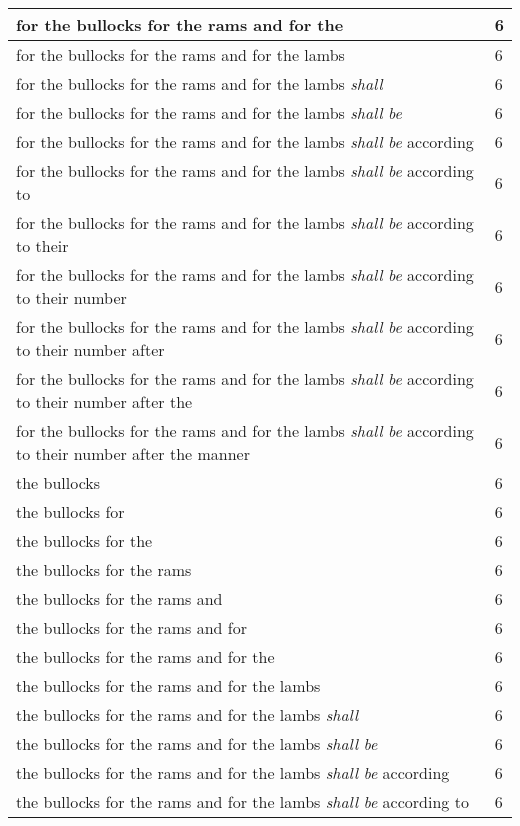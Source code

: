 \begin{center}
\begin{longtable}{|p{3.0in}|p{0.5in}|}
for the bullocks for the rams and for the & 6\\ \hline 
for the bullocks for the rams and for the lambs & 6\\ \hline 
for the bullocks for the rams and for the lambs \emph{shall} & 6\\ \hline 
for the bullocks for the rams and for the lambs \emph{shall} \emph{be} & 6\\ \hline 
for the bullocks for the rams and for the lambs \emph{shall} \emph{be} according & 6\\ \hline 
for the bullocks for the rams and for the lambs \emph{shall} \emph{be} according to & 6\\ \hline 
for the bullocks for the rams and for the lambs \emph{shall} \emph{be} according to their & 6\\ \hline 
for the bullocks for the rams and for the lambs \emph{shall} \emph{be} according to their number & 6\\ \hline 
for the bullocks for the rams and for the lambs \emph{shall} \emph{be} according to their number after & 6\\ \hline 
for the bullocks for the rams and for the lambs \emph{shall} \emph{be} according to their number after the & 6\\ \hline 
for the bullocks for the rams and for the lambs \emph{shall} \emph{be} according to their number after the manner & 6\\ \hline 
the bullocks & 6\\ \hline 
the bullocks for & 6\\ \hline 
the bullocks for the & 6\\ \hline 
the bullocks for the rams & 6\\ \hline 
the bullocks for the rams and & 6\\ \hline 
the bullocks for the rams and for & 6\\ \hline 
the bullocks for the rams and for the & 6\\ \hline 
the bullocks for the rams and for the lambs & 6\\ \hline 
the bullocks for the rams and for the lambs \emph{shall} & 6\\ \hline 
the bullocks for the rams and for the lambs \emph{shall} \emph{be} & 6\\ \hline 
the bullocks for the rams and for the lambs \emph{shall} \emph{be} according & 6\\ \hline 
the bullocks for the rams and for the lambs \emph{shall} \emph{be} according to & 6\\ \hline 

\end{longtable}
\end{center}
